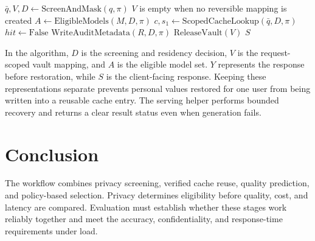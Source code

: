 \begin{algorithm}[H]
\small
{}
\SetAlgoLined
{}
$\bar q,V,D\leftarrow\mathrm{ScreenAndMask}(q,\pi)$\;
$V$ is empty when no reversible mapping is created\;
$A\leftarrow\mathrm{EligibleModels}(M,D,\pi)$\;
$c,s_1\leftarrow\mathrm{ScopedCacheLookup}(\bar q,D,\pi)$\;
$\mathit{hit}\leftarrow\mathrm{False}$\;
$\mathrm{WriteAuditMetadata}(R,D,\pi)$\;
$\mathrm{ReleaseVault}(V)$\;
\Return $S$\;
\caption{Request Processing with Privacy-Constrained Model Selection}
\label{alg:routing}
\end{algorithm}

In the algorithm, $D$ is the screening and residency decision, $V$ is the request-scoped vault mapping, and $A$ is the eligible model set. $Y$ represents the response before restoration, while $S$ is the client-facing response. Keeping these representations separate prevents personal values restored for one user from being written into a reusable cache entry. The serving helper performs bounded recovery and returns a clear result status even when generation fails.

\section{Conclusion}
\label{sec:ch5-conclusion}

The workflow combines privacy screening, verified cache reuse, quality prediction, and policy-based selection. Privacy determines eligibility before quality, cost, and latency are compared. Evaluation must establish whether these stages work reliably together and meet the accuracy, confidentiality, and response-time requirements under load.
\clearpage
